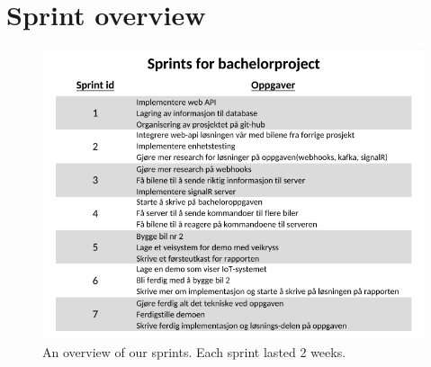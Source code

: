 \chapter{Sprint overview}
\begin{figure}[h!]
	\centering
	\includegraphics[width=1\linewidth]{figures/Sprint_overview}
	\caption[Sprint overview]{An overview of our sprints. Each sprint lasted 2 weeks.}
	\label{fig:sprintoverview}
\end{figure}